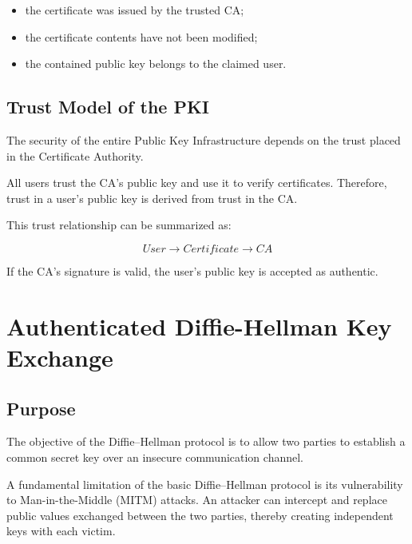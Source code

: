 \documentclass[12pt]{article}
\begin{document}
\begin{itemize}
\item the certificate was issued by the trusted CA;
\item the certificate contents have not been modified;
\item the contained public key belongs to the claimed user.
\end{itemize}


\subsection{Trust Model of the PKI}

The security of the entire Public Key Infrastructure depends on the trust placed
in the Certificate Authority.

All users trust the CA's public key and use it to verify certificates.
Therefore, trust in a user's public key is derived from trust in the CA.

This trust relationship can be summarized as:

\begin{equation}
User \rightarrow Certificate \rightarrow CA
\end{equation}

If the CA's signature is valid, the user's public key is accepted as authentic.





\newpage
\section{Authenticated Diffie-Hellman Key Exchange}

\subsection{Purpose}

The objective of the Diffie--Hellman protocol is to allow two parties to
establish a common secret key over an insecure communication channel.

A fundamental limitation of the basic Diffie--Hellman protocol is its
vulnerability to Man-in-the-Middle (MITM) attacks. An attacker can intercept
and replace public values exchanged between the two parties, thereby creating
independent keys with each victim.
\end{document}
